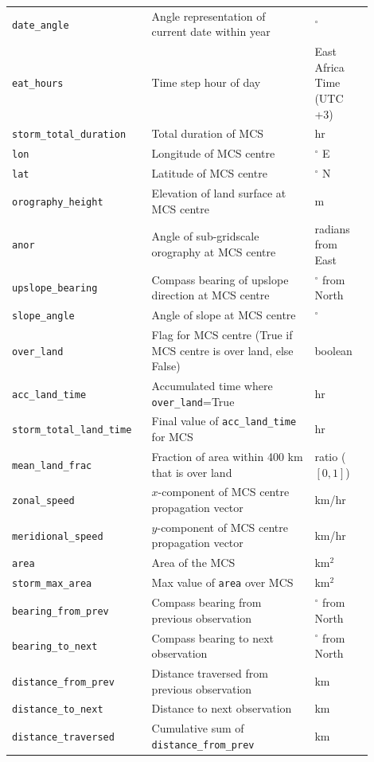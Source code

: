 {\begin{longtable}{>{\raggedright\arraybackslash}p{0.33\linewidth} p{0.42\linewidth} >{\raggedright\arraybackslash}p{0.15\linewidth}}
    \texttt{date\_angle} & Angle representation of current date within year & $^\circ$ \\
    \texttt{eat\_hours} & Time step hour of day & East Africa Time (UTC +3) \\
    \texttt{storm\_total\_duration} & Total duration of MCS & hr \\
    \texttt{lon} & Longitude of MCS centre & $^\circ$ E \\
    \texttt{lat} & Latitude of MCS centre & $^\circ$ N \\
    \texttt{orography\_height} & Elevation of land surface at MCS centre & m \\
    \texttt{anor} & Angle of sub-gridscale orography at MCS centre & radians from East \\
    \texttt{upslope\_bearing} & Compass bearing of upslope direction at MCS centre & $^\circ$ from North \\
    \texttt{slope\_angle} & Angle of slope at MCS centre & $^\circ$ \\
    \texttt{over\_land} & Flag for MCS centre (True if MCS centre is over land, else False) & boolean \\
    \texttt{acc\_land\_time} & Accumulated time where \texttt{over\_land}=True & hr \\
    \texttt{storm\_total\_land\_time} & Final value of \texttt{acc\_land\_time} for MCS & hr \\
    \texttt{mean\_land\_frac} & Fraction of area within 400 km that is over land & ratio ($[0,1]$) \\
    \texttt{zonal\_speed} & $x$-component of MCS centre propagation vector & km/hr \\
    \texttt{meridional\_speed} & $y$-component of MCS centre propagation vector & km/hr \\
    \texttt{area} & Area of the MCS & km$^2$ \\
    \texttt{storm\_max\_area} & Max value of \texttt{area} over MCS & km$^2$ \\
    \texttt{bearing\_from\_prev} & Compass bearing from previous observation & $^\circ$ from North \\
    \texttt{bearing\_to\_next} & Compass bearing to next observation & $^\circ$ from North \\
    \texttt{distance\_from\_prev} & Distance traversed from previous observation & km \\
    \texttt{distance\_to\_next} & Distance to next observation & km \\
    \texttt{distance\_traversed} & Cumulative sum of \texttt{distance\_from\_prev} & km \\

\end{longtable}}
